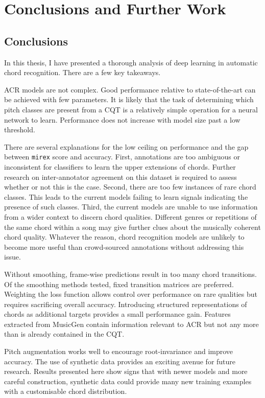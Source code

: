 
\chapter{Conclusions and Further Work}

\section{Conclusions}

In this thesis, I have presented a thorough analysis of deep learning in automatic chord recognition. There are a few key takeaways.

ACR models are not complex. Good performance relative to state-of-the-art can be achieved with few parameters. It is likely that the task of determining which pitch classes are present from a CQT is a relatively simple operation for a neural network to learn. Performance does not increase with model size past a low threshold.

There are several explanations for the low ceiling on performance and the gap between \texttt{mirex} score and accuracy. First, annotations are too ambiguous or inconsistent for classifiers to learn the upper extensions of chords. Further research on inter-annotator agreement on this dataset is required to assess whether or not this is the case. Second, there are too few instances of rare chord classes. This leads to the current models failing to learn signals indicating the presence of such classes. Third, the current models are unable to use information from a wider context to discern chord qualities. Different genres or repetitions of the same chord within a song may give further clues about the musically coherent chord quality. Whatever the reason, chord recognition models are unlikely to become more useful than crowd-sourced annotations without addressing this issue. 

Without smoothing, frame-wise predictions result in too many chord transitions. Of the smoothing methods tested, fixed transition matrices are preferred. Weighting the loss function allows control over performance on rare qualities but requires sacrificing overall accuracy. Introducing structured representations of chords as additional targets provides a small performance gain. Features extracted from MusicGen contain information relevant to ACR but not any more than is already contained in the CQT.

Pitch augmentation works well to encourage root-invariance and improve accuracy. The use of synthetic data provides an exciting avenue for future research. Results presented here show signs that with newer models and more careful construction, synthetic data could provide many new training examples with a customisable chord distribution.

